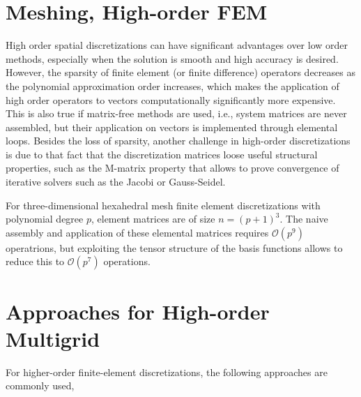 \documentclass[times]{nlaauth}
\begin{document}
\section{Meshing, High-order FEM}


High order spatial discretizations can have significant advantages
over low order methods, especially when the solution is smooth and
high accuracy is desired. However, the sparsity of finite element (or
finite difference) operators decreases as the polynomial approximation
order increases, which makes the application of high order operators
to vectors computationally significantly more expensive. This is also
true if matrix-free methods are used, i.e., system matrices are never
assembled, but their application on vectors is implemented through
elemental loops.  Besides the loss of sparsity, another challenge in
high-order discretizations is due to that fact that the discretization
matrices loose useful structural properties, such as the M-matrix
property that allows to prove convergence of iterative solvers such as
the Jacobi or Gauss-Seidel.

For three-dimensional hexahedral mesh finite element discretizations
with polynomial degree $p$, element matrices are of size
$n=(p+1)^3$. The naive assembly and application of these elemental
matrices requires $\mathcal O(p^9)$ operatrions, but exploiting the
tensor structure of the basis functions allows to reduce this to
$\mathcal O(p^7)$ operations.





\section{Approaches for High-order Multigrid}


For higher-order finite-element discretizations, the following
approaches are commonly used,
\end{document}

